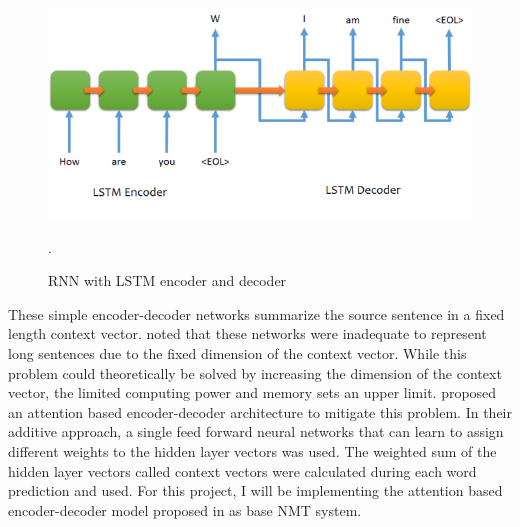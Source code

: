 \begin{figure}[ht]
	\centering
	\includegraphics[scale=0.9]{images/seq2seq}
	\caption{RNN with LSTM encoder and decoder \citep{sutskever2014sequence}}.
	\label{seq2seq}
\end{figure}


These simple encoder-decoder networks summarize the source sentence in a fixed length context vector. \cite{bahdanau2014neural} noted that these networks were inadequate to represent long sentences due to the fixed dimension of the context vector. While this problem could theoretically be solved by increasing the dimension of the context vector, the limited computing power and memory sets an upper limit. \cite{bahdanau2014neural} proposed an attention based encoder-decoder architecture to mitigate this problem. In their additive approach, a single feed forward neural networks that can learn to assign different weights to the hidden layer vectors was used. The weighted sum of the hidden layer vectors called context vectors were calculated during each word prediction and used.  For this project, I will be implementing the attention based encoder-decoder model proposed in \cite{bahdanau2014neural} as base NMT system.



